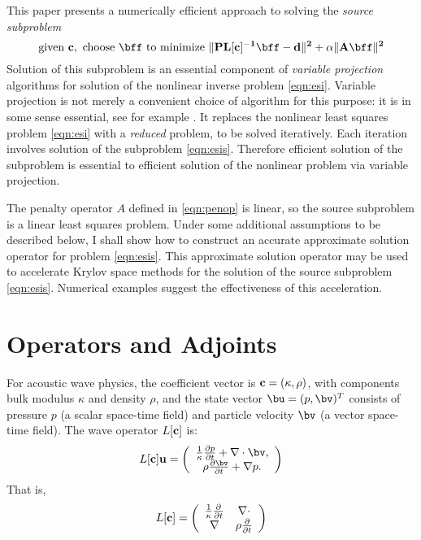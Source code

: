 This paper presents a numerically efficient approach to solving the {\em source subproblem}
\begin{equation}
\label{eqn:esis}
\mbox{given } \bf{c}, \mbox{ choose } \bff \mbox{ to minimize } \|PL[\bf{c}]^{-1}\bff -d \|^2 + \alpha \|A\bff\|^2 
\end{equation}
Solution of this subproblem is an essential component of {\em variable
  projection} algorithms for solution of the nonlinear inverse problem
\ref{eqn:esi}. Variable projection is not merely a convenient choice
of algorithm for this purpose: it is in some sense essential, see for
example \cite{Symes:SEG20}. It replaces the nonlinear
least squares problem \ref{eqn:esi} with a {\em reduced} problem, to
be solved iteratively. Each iteration involves solution of the
subproblem \ref{eqn:esis}. Therefore efficient solution of the
subproblem is essential to efficient solution of the nonlinear problem
via variable projection.

The penalty operator $A$ defined in \ref{eqn:penop} is linear, so the source
subproblem is a linear least squares problem. Under some additional
assumptions to be described below, I shall show how to construct an
accurate approximate solution operator for problem
\ref{eqn:esis}. This approximate solution operator may be used to
accelerate Krylov space methods for the solution of the source
subproblem \ref{eqn:esis}. Numerical examples suggest the
effectiveness of this acceleration.

\section{Operators and Adjoints}

For acoustic wave physics, the coefficient vector is
$\bf{c}=(\kappa,\rho)$, with components bulk modulus $\kappa$ and
density $\rho$, and the state vector $\bu=(p,\bv)^T$ consists of
pressure $p$ (a scalar space-time field) and particle velocity $\bv$
(a vector space-time field). The wave operator $L[\bf{c}]$ is:
\begin{equation}
\label{eqn:aweop}
L[\bf{c}]\bf{u} = 
\left(
\begin{array}{c}
\frac{1}{\kappa}\frac{\partial p}{\partial t}  + \nabla \cdot \bv, \\
\rho\frac{\partial \bv}{\partial t} + \nabla p.
\end{array}
\right) 
\end{equation}
That is,
\begin{equation}
  \label{eqn:awemat}
  L[\bf{c}] = \left(
    \begin{array}{cc}
      \frac{1}{\kappa}\frac{\partial}{\partial t} & \nabla \cdot \\
      \nabla & \rho \frac{\partial}{\partial t}
    \end{array}
  \right)
\end{equation}

